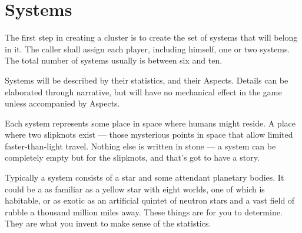 \section{Systems}\label{sec:Systems} %

The first step in creating a cluster is to create the set of systems that will belong in it. The caller shall assign each player, including himself, one or two systems. The total number of systems usually is between six and ten.

Systems will be described by their statistics, and their Aspects. Details can be elaborated through narrative, but will have no mechanical effect in the game unless accompanied by Aspects.

Each system represents some place in space where humans might reside. A place where two slipknots exist --- those mysterious points in space that allow limited faster-than-light travel. Nothing else is written in stone --- a system can be completely empty but for the slipknots, and that's got to have a story.

Typically a system consists of a star and some attendant planetary bodies. It could be a as familiar as a yellow star with eight worlds, one of which is habitable, or as exotic as an artificial quintet of neutron stars and a vast field of rubble a thousand million miles away. These things are for you to determine. They are what you invent to make sense of the statistics.
